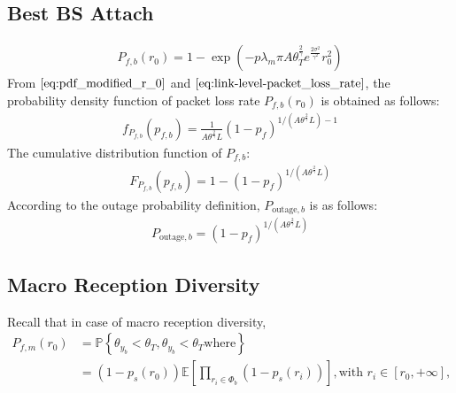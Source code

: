 \subsection{Best BS Attach}
\begin{align}
	\label{eq:link-level-packet_loss_rate}
	P_{f, b}(r_{0}) = 1- \exp(-p \lambda_{m} \pi A \theta_{T}^{\frac{2}{\gamma}} e^{\frac{2\sigma^2}{\gamma^2}}  r_{0}^2 )
\end{align}
From $\eqref{eq:pdf_modified_r_0}$ and $\eqref{eq:link-level-packet_loss_rate}$, the probability density function of packet loss rate $P_{f, b}(r_{0})$ is obtained as follows:
\begin{align}
	f_{P_{f,b}}(p_{f,b}) =\frac{1}{ A \theta^{\frac{2}{\gamma}} L } (1-p_f)^{ 1 / \left( A \theta^{\frac{2}{\gamma}} L\right) - 1} 
\end{align}
The cumulative distribution function of $P_{f,b}$:
\begin{align}
F_{P_{f,b}}(p_{f,b}) =1 - (1-p_f)^{ 1 / \left( A \theta^{\frac{2}{\gamma}} L\right) } 
\end{align}
According to the outage probability definition, $P_{\text{outage}, b}$ is as follows:
\begin{align}
	P_{\text{outage}, b} = (1-p_f)^{ 1 / \left( A \theta^{\frac{2}{\gamma}} L \right) } 
\end{align}

\subsection{Macro Reception Diversity}
Recall that in case of macro reception diversity, 
\begin{align}
\label{eq:definition_pf1} 
P_{f, m}(r_{0}) &= \mathbb{P}\left\lbrace  \theta_{y_b} < \theta_{T}, \theta_{y_b} < \theta_{T} \text{where} \right\rbrace \nonumber\\
&= ( 1-p_s( r_{0} ) ) \mathbb{E} \left[  \prod_{r_i \in \Phi_{b}} (1-p_{s}(r_i)) \right], \text{with } r_i \in \left[ r_{0}, +\infty\right],
\end{align} 

